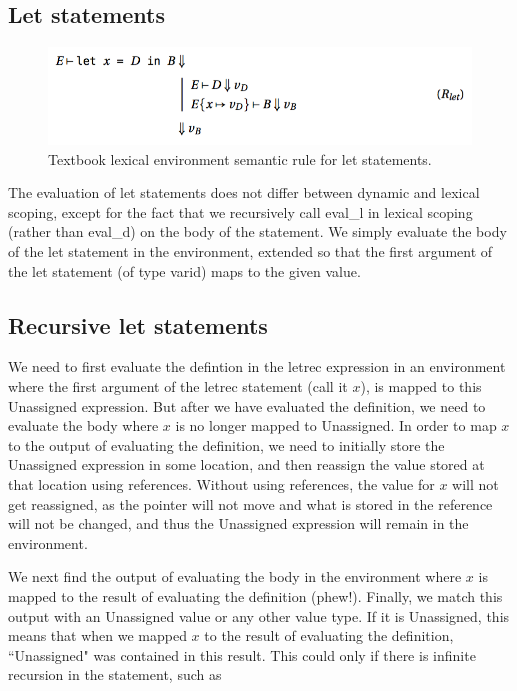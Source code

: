\documentclass{article}
\begin{document}
\subsection{Let statements}

\begin{figure}[h]
\begin{center}
\includegraphics[width=.7\textwidth]{let_lex.png}
\end{center}
\caption{Textbook lexical environment semantic rule for let statements.}
\end{figure}

The evaluation of let statements does not differ between dynamic and lexical scoping, except for the fact that we recursively call eval\_l in lexical scoping (rather than eval\_d) on the body of the statement. We simply evaluate the body of the let statement in the environment, extended so that the first argument of the let statement (of type varid) maps to the given value.

\subsection{Recursive let statements}
We need to first evaluate the defintion in the letrec expression in an environment where the first argument of the letrec statement (call it $x$), is mapped to this Unassigned expression. But after we have evaluated the definition, we need to evaluate the body where $x$ is no longer mapped to Unassigned. In order to map $x$ to the output of evaluating the definition, we need to initially store the Unassigned expression in some location, and then reassign the value stored at that location using references. Without using references, the value for $x$ will not get reassigned, as the pointer will not move and what is stored in the reference will not be changed, and thus the Unassigned expression will remain in the environment. 

We next find the output of evaluating the body in the environment where $x$ is mapped to the result of evaluating the definition (phew!). Finally, we match this output with an Unassigned value or any other value type. If it is Unassigned, this means that when we mapped $x$ to the result of evaluating the definition, ``Unassigned" was contained in this result. This could only if there is infinite recursion in the statement, such as 
\end{document}
